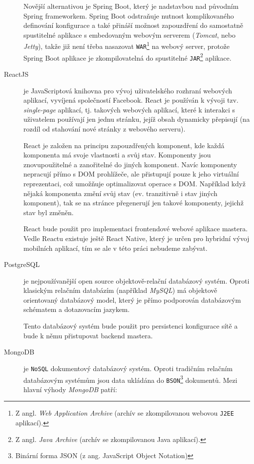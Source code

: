 \begin{description}
    Novější alternativou je Spring Boot, který je nadstavbou nad původním Spring frameworkem. Spring Boot odstraňuje nutnost komplikovaného definování konfigurace a také přináší možnost zapouzdření do samostatně spustitelné aplikace s embedovaným webovým serverem (\textit{Tomcat}, nebo \textit{Jetty}), takže již není třeba nasazovat \texttt{WAR}\footnote{Z angl. \textit{Web Application Archive} (archív se zkompilovanou webovou \texttt{J2EE} aplikací).} na webový server, protože Spring Boot aplikace je zkompilovatelná do spustitelné \texttt{JAR}\footnote{Z angl. \textit{Java Archive} (archív se zkompilovanou Java aplikací).} aplikace.
    
    \item[ReactJS]\label{chap:arch:technologie:react} je JavaScriptová knihovna pro vývoj uživatelského rozhraní webových aplikací, vyvíjená společností Facebook. React je používán k vývoji tzv. \textit{single-page} aplikací, tj. takových webových aplikací, které k interakci s uživatelem používají jen jednu stránku, jejíž obsah dynamicky přepisují (na rozdíl od stahování nové stránky z webového serveru).
    
    React je založen na principu zapouzdřených komponent, kde každá komponenta má svoje vlastnosti a svůj stav. Komponenty jsou znovupoužitelné a zanořitelné do jiných komponent. Navíc komponenty nepracují přímo s DOM prohlížeče, ale přistupují pouze k jeho virtuální reprezentaci, což umožňuje optimalizovat operace s DOM. Například když nějaká komponenta změní svůj stav (ev. tranzitivně i stav jiných komponent), tak se na stránce přegenerují jen takové komponenty, jejichž stav byl změněn.

    React bude použit pro implementaci frontendové webové aplikace mastera. Vedle Reactu existuje ještě React Native, který je určen pro hybridní vývoj mobilních aplikací, tím se ale v této práci nebudeme zabývat.
    
    \item[PostgreSQL]\label{chap:arch:technologie:postgresql} je nejpoužívanější open source objektově-relační databázový systém. Oproti klasickým relačním databázím (například \textit{MySQL}) má objektově orientovaný databázový model, který je přímo podporován databázovým schématem a dotazovacím jazykem.
    
    Tento databázový systém bude použit pro persistenci konfigurace sítě a bude k němu přistupovat backend mastera.
    
    \item[MongoDB]\label{chap:arch:technologie:mongodb} je \texttt{NoSQL} dokumentový databázový systém. Oproti tradičním relačním databázovým systémům jsou data ukládána do \texttt{BSON}\footnote{Binární forma JSON (z ang. JavaScript Object Notation)} dokumentů. Mezi hlavní výhody \textit{MongoDB} patří:


\end{description}
